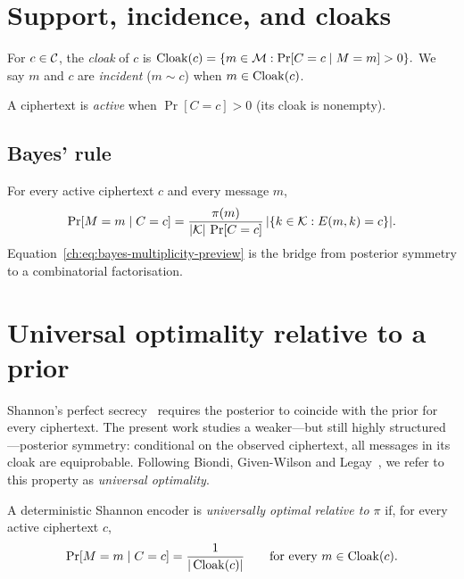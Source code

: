 \section{Support, incidence, and cloaks}\label{ch:sec:support-incidence-and-cloaks}

\begin{definition}\label{ch:def:cloak-basics}
For $c\in\mathcal{C}$, the \emph{cloak} of $c$ is
$\operatorname{Cloak}(c)=\{m\in\mathcal{M}:\Pr[C=c\mid M=m]>0\}.$
We say $m$ and $c$ are \emph{incident} ($m\sim c$) when $m\in\operatorname{Cloak}(c)$.
\end{definition}

A ciphertext is \emph{active} when $\Pr[C=c]>0$ (its cloak is nonempty).

\subsection{Bayes' rule}\label{ch:sec:bayes-rule}

For every active ciphertext $c$ and every message $m$,
\begin{equation}\label{ch:eq:bayes-multiplicity-preview}
\Pr[M=m\mid C=c]
=\frac{\pi(m)}{|\mathcal{K}|\,\Pr[C=c]}\,
|\{k\in\mathcal{K}:E(m,k)=c\}|.
\end{equation}
Equation~\eqref{ch:eq:bayes-multiplicity-preview} is the bridge from
posterior symmetry to a combinatorial factorisation.

\section{Universal optimality relative to a prior}\label{ch:sec:universal-optimality-relative-to-a-prior}

Shannon's perfect secrecy~\cite{shannon1949} requires the posterior to
coincide with the prior for every ciphertext.  The present work studies
a weaker---but still highly structured---posterior symmetry: conditional
on the observed ciphertext, all messages in its cloak are equiprobable.
Following Biondi, Given-Wilson and
Legay~\cite{biondi2018apollonian}, we refer to this property as
\emph{universal optimality}.

\begin{definition}\label{ch:def:universal-optimality-basics}
A deterministic Shannon encoder is \emph{universally optimal relative
to $\pi$} if, for every active ciphertext $c$,
\[
\Pr[M=m\mid C=c]=\frac1{|\operatorname{Cloak}(c)|}
\qquad\text{for every }m\in\operatorname{Cloak}(c).
\]
\end{definition}

